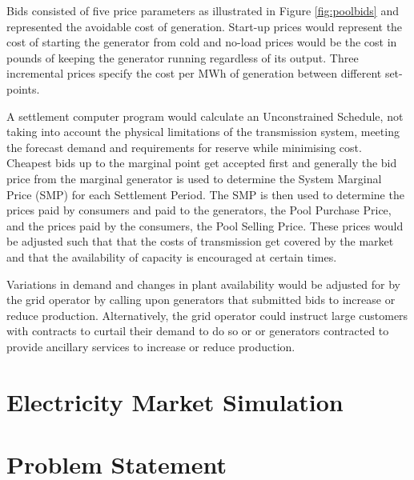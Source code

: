 Bids consisted of five price parameters as illustrated in Figure
\ref{fig:poolbids} and represented the avoidable cost of generation.  Start-up
prices would represent the cost of starting the generator from cold and no-load
prices would be the cost in pounds of keeping the generator running regardless
of its output. Three incremental prices specify the cost per MWh of generation
between different set-points.

A settlement computer program would calculate an Unconstrained Schedule,
not taking into account the physical limitations of the transmission system,
meeting the forecast demand and requirements for reserve while minimising cost.
Cheapest bids up to the marginal point get accepted first and generally the
bid price from the marginal generator is used to determine the System Marginal
Price (SMP) for each Settlement Period.  The SMP is then used to determine the
prices paid by consumers and paid to the generators, the Pool Purchase Price,
and the prices paid by the consumers, the Pool Selling Price.  These prices
would be adjusted such that that the costs of transmission get covered by the
market and that the availability of capacity is encouraged at certain times.

Variations in demand and changes in plant availability would be adjusted for by
the grid operator by calling upon generators that submitted bids to increase or
reduce production.  Alternatively, the grid operator could instruct large
customers with contracts to curtail their demand to do so or or generators
contracted to provide ancillary services to increase or reduce production.

\section{Electricity Market Simulation}


\section{Problem Statement}%


